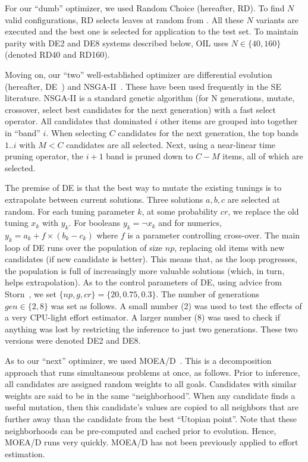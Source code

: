 For our ``dumb''  optimizer, we used   Random Choice (hereafter, RD). To find $N$ valid configurations, RD
selects leaves at random from .
All these $N$ variants are executed and the best one is selected for application to the test set. To maintain parity with   DE2 and DE8 systems described below, 
OIL uses  $N\in\{40,160\}$ (denoted RD40 and RD160). 

Moving on, our ``two'' well-established optimizer are differential evolution (hereafter, DE~\cite{storn1997differential}) and NSGA-II~\cite{deb02}. These have been used frequently in the SE literature\cite{Fu2016TuningFS,AGRAWAL2018,agrawal2017better,sayyad2013value,sayyad2013pareto}.
 NSGA-II is a standard genetic algorithm  (for N generations, mutate, crossover, select best candidates  for the next generation) with a fast   select operator. 
All candidates that dominated $i$ other items are grouped into together in ``band'' $i$.
When selecting $C$ candidates for the next generation, the top bands $1..i$ with $M< C$ candidates
are all selected.  Next, using a  near-linear time pruning operator, the $i+1$ band is pruned down to $C-M$ items, all of which are selected.


 The premise of DE is that the best way to mutate the existing tunings is to extrapolate between current solutions. Three solutions $a, b, c$ are selected at random. For each tuning parameter $k$, at some probability $cr$, we replace the old tuning $x_k$ with $y_k$. For
 booleans $y_k = \neg x_k$ and for numerics, 
\mbox{$y_k = a_k + f \times (b_k - c_k)$}
where $f$ is a
 parameter controlling cross-over.  
The main loop of DE runs over the population of size $np$, replacing old items with new candidates (if new candidate is better). This means that, as the loop progresses, the population is full of increasingly more valuable solutions (which, in turn,
helps   extrapolation). 
As to the control parameters of DE,  using advice from Storn~\cite{storn1997differential}, we set $\{\mathit{np,g,cr}\}=\{20,0.75,0.3\}$.
The number of generations $\mathit{gen}\in\{2,8\}$ was set as follows. A   small number (2) was used to test
the effects of  a very   CPU-light    effort estimator. A  larger number (8) was used to check if anything was
lost by restricting the inference to just two generations. These two versions were denoted DE2 and DE8.

As to our ``next'' optimizer, we used MOEA/D~\cite{Zhang07}.
This is a decomposition approach that
runs simultaneous   problems at once, as follows.  Prior to inference,
all candidates are assigned random weights to all  goals. Candidates
with similar weights are said to be in the same ``neighborhood''. When any candidate
 finds a useful mutation, then this candidate's
 values are copied to all neighbors that are further away than the candidate from the  best ``Utopian point''. Note that  these neighborhoods can be pre-computed and cached
prior to evolution. Hence, MOEA/D runs very quickly.
 MOEA/D has not been previously applied to effort estimation.

